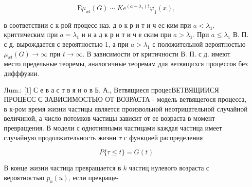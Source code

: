 \documentclass[10pt]{article}
\begin{document}
\[

\mathrm{E} \mu_{x t}(G) \sim K e^{\left(a-\lambda_{1}\right) t} \varphi_{1}(x),

\]



в соответствии с к-рой процесс наз. д о к р и т и ч ес ким при $a<\lambda_{1}$, криттическим при $a=\lambda_{1}$ и н а д к р и т и ч е ским при $a>\lambda_{1}$. При $a \leqslant \lambda_{1}$ В. П. с д. вырождается с вероятностью 1, а при $a>\lambda_{1}$ с положительной вероятностью $\mu_{x t}(G) \rightarrow \infty$ при $t \rightarrow \infty$. В зависимости от критичности В. П. с д. имеют место предельные теоремы, аналогичные теоремам для ветвящихся процессов без дифффузии.



Лum.: [1] С е в а с т в я н о в Б. А., Ветвящиеся процесВЕТВЯЩИИСЯ ПРОЦЕСС С ЗАВИСИМОСТЬЮ ОТ ВОЗРАСТА - модель ветвящегося процесса, в к-ром время жизни частицы является произвольной неотрицательной случайной величиной, а число потомков частицы зависит от ее возраста в момент превращения. В модели с однотипными частицами каждая частица имеет случайную продолжительность жизни $\tau$ с функцией распределения



\[

P\{\tau \leqslant t\}=G(t)

\]



В конце жизни частица превращается в $k$ частиц нулевого возраста с вероятностью $p_{k}(u)$, если превраще-
\end{document}
